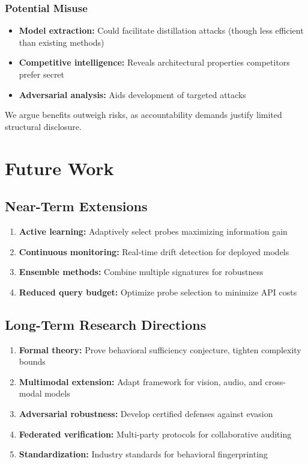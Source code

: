 \documentclass[11pt,a4paper]{article}
\begin{document}
\subsubsection{Potential Misuse}

\begin{itemize}
\item \textbf{Model extraction:} Could facilitate distillation attacks (though less efficient than existing methods)
\item \textbf{Competitive intelligence:} Reveals architectural properties competitors prefer secret
\item \textbf{Adversarial analysis:} Aids development of targeted attacks
\end{itemize}

We argue benefits outweigh risks, as accountability demands justify limited structural disclosure.

\section{Future Work}

\subsection{Near-Term Extensions}

\begin{enumerate}
\item \textbf{Active learning:} Adaptively select probes maximizing information gain
\item \textbf{Continuous monitoring:} Real-time drift detection for deployed models
\item \textbf{Ensemble methods:} Combine multiple signatures for robustness
\item \textbf{Reduced query budget:} Optimize probe selection to minimize API costs
\end{enumerate}

\subsection{Long-Term Research Directions}

\begin{enumerate}
\item \textbf{Formal theory:} Prove behavioral sufficiency conjecture, tighten complexity bounds
\item \textbf{Multimodal extension:} Adapt framework for vision, audio, and cross-modal models
\item \textbf{Adversarial robustness:} Develop certified defenses against evasion
\item \textbf{Federated verification:} Multi-party protocols for collaborative auditing
\item \textbf{Standardization:} Industry standards for behavioral fingerprinting
\end{enumerate}
\end{document}
